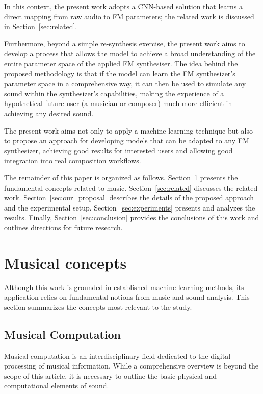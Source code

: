 \documentclass[10pt,conference]{IEEEtran}
\begin{document}
In this context, the present work adopts a CNN-based solution that learns a direct mapping from raw audio to FM parameters; the related work is discussed in Section~\ref{sec:related}.

Furthermore, beyond a simple re-synthesis exercise, the present work aims to develop a process that allows the model to achieve a broad understanding of the entire parameter space of the applied FM synthesiser. The idea behind the proposed methodology is that if the model can learn the FM synthesizer’s parameter space in a comprehensive way, it can then be used to simulate any sound within the synthesizer’s capabilities, making the experience of a hypothetical future user (a musician or composer) much more efficient in achieving any desired sound.

The present work aims not only to apply a machine learning technique but also to propose an approach for developing models that can be adapted to any FM synthesizer, achieving good results for interested users and allowing good integration into real composition workflows.

The remainder of this paper is organized as follows. Section~\ref{sec:fund} presents the fundamental concepts related to music. Section~\ref{sec:related} discusses the related work. Section~\ref{sec:our_proposal} describes the details of the proposed approach and the experimental setup. Section~\ref{sec:experiments} presents and analyzes the results. Finally, Section~\ref{sec:conclusion} provides the conclusions of this work and outlines directions for future research.

\section{Musical concepts} \label{sec:fund} 

Although this work is grounded in established machine learning methods, its application relies on fundamental notions from music and sound analysis. This section summarizes the concepts most relevant to the study.

\subsection{Musical Computation}

Musical computation is an interdisciplinary field dedicated to the digital processing of musical information. While a comprehensive overview is beyond the scope of this article, it is necessary to outline the basic physical and computational elements of sound.
\end{document}
